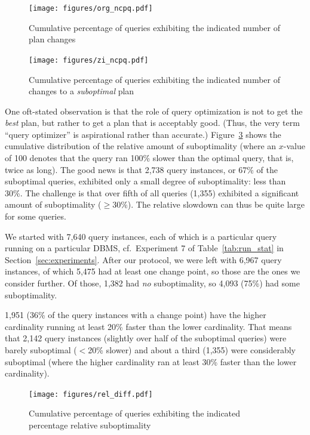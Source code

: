 \documentclass[prodmode,acmtods]{acmsmall}
\begin{document}
\begin{figure}[h!]\centering
\texttt{[image: figures/org\_ncpq.pdf]}
\caption{Cumulative percentage of queries \hbox{exhibiting} the \hbox{indicated}
  number of plan changes\label{fig:planchanges}}
\end{figure}

\begin{figure}[t]\centering
\texttt{[image: figures/zi\_ncpq.pdf]}
\caption{Cumulative percentage of queries exhibiting the \hbox{indicated}
  number of changes to a {\em suboptimal} plan\label{fig:suboptplanchanges}}
\vspace*{-2ex}
\end{figure}

One oft-stated observation is that the role of query optimization is not to
get the {\em best} plan, but rather to get a plan that is acceptably
good. (Thus, the very term ``query optimizer'' is aspirational rather than
accurate.) Figure~\ref{fig:suboptcumulative} shows
the cumulative distribution of the relative amount of suboptimality (where
an $x$-value of 100 denotes that the query ran 100\% slower than the optimal
query, that is, twice as long). The good news is that 2,738 query instances,
or 67\% of the suboptimal queries, exhibited only a small degree of
suboptimality: less than 30\%. The challenge is that over fifth of all
queries (1,355) exhibited a significant amount of suboptimality ($\geq
30\%$). The relative slowdown can thus be quite large for some queries.

We started with 7,640 query instances, each of which is a particular query running on a
particular DBMS, cf.~Experiment 7 of Table~\ref{tab:run_stat}
in Section~\ref{sec:experiments}. After our protocol, we were left with
  6,967 query instances, of which 5,475 had at least one change point, so those are
  the ones we consider further. Of those, 1,382 had {\em no} suboptimality, so
4,093 (75\%) had some suboptimality. 

1,951 (36\% of the query instances with a change point) have the higher cardinality
running at least 20\% faster than the lower cardinality. That means that
2,142 query instances (slightly over half of the suboptimal queries) were barely
suboptimal ($<$20\% slower) and about a third (1,355) were considerably
suboptimal (where the higher cardinality ran at least 30\% faster than the
lower cardinality).

\begin{figure}\centering
\texttt{[image: figures/rel\_diff.pdf]}
\caption{Cumulative percentage of queries exhibiting the \hbox{indicated}
  percentage relative suboptimality\label{fig:suboptcumulative}}
\end{figure}
\end{document}
